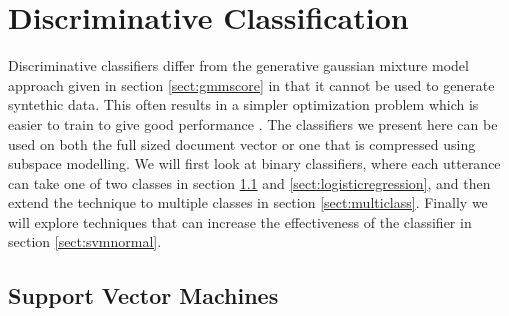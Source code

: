 \chapter{Discriminative Classification}
\label{sect:classify}

Discriminative classifiers differ from the generative gaussian mixture model approach given in section \ref{sect:gmmscore} in that it cannot be used to generate syntethic data. This often results in a simpler optimization problem which is easier to train to give good performance \cite[p. 204]{machinelearningbook}. The classifiers we present here can be used on both the full sized document vector or one that is compressed using subspace modelling. We will first look at binary classifiers, where each utterance can take one of two classes in section \ref{sect:svm} and \ref{sect:logisticregression}, and then extend the technique to multiple classes in section \ref{sect:multiclass}. Finally we will explore techniques that can increase the effectiveness of the classifier in section \ref{sect:svmnormal}.

\section{Support Vector Machines}
\label{sect:svm}

